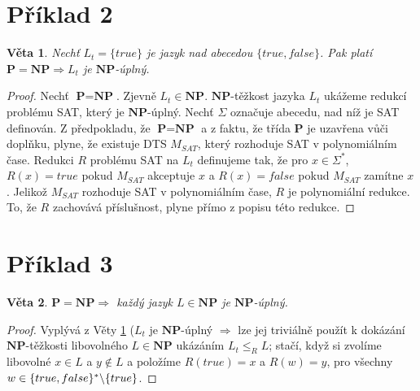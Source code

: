 \documentclass[10pt,a4paper]{article}
\newtheorem{theorem}{Věta}
\newcommand{\bs}{\char`\\} %
\begin{document}
\vspace{-1cm}
\section*{Příklad 2}

\begin{theorem}
\label{theorem:Ex2}
	Nechť $L_{t} = \{true\}$ je jazyk nad abecedou $\{true, false\}$. Pak platí $\textbf{P} = \textbf{NP} \Rightarrow L_{t}$ je $\textbf{NP}$-úplný.
\end{theorem}

\begin{proof}
	Nechť $\textbf{P} = \textbf{NP}$. Zjevně $L_{t} \in \textbf{NP}$. $\textbf{NP}$-těžkost jazyka $L_{t}$ ukážeme redukcí problému SAT, který je $\textbf{NP}$-úplný. Nechť $\Sigma$ označuje abecedu, nad níž je SAT definován. Z předpokladu, že $\textbf{P} = \textbf{NP}$ a z faktu, že třída \textbf{P} je uzavřena vůči doplňku, plyne, že existuje DTS $M_{SAT}$, který rozhoduje SAT v polynomiálním čase. Redukci $R$ problému SAT na $L_{t}$ definujeme tak, že pro $x \in \Sigma^{*}$, $R(x) = true$ pokud $M_{SAT}$ akceptuje $x$ a $R(x) = false$ pokud $M_{SAT}$ zamítne $x$. Jelikož $M_{SAT}$ rozhoduje SAT v polynomiálním čase, $R$ je polynomiální redukce. To, že $R$ zachovává příslušnost, plyne přímo z popisu této redukce.
\end{proof}

\section*{Příklad 3}

\begin{theorem}
\label{theorem:Ex3}
	$\textbf{P} = \textbf{NP} \Rightarrow$ každý jazyk $L \in \textbf{NP}$ je $\textbf{NP}$-úplný.
\end{theorem}

\begin{proof}
	Vyplývá z Věty \ref{theorem:Ex2} ($L_{t}$ je $\textbf{NP}$-úplný $\Rightarrow$ lze jej triviálně použít k dokázání $\textbf{NP}$-těžkosti libovolného $L \in \textbf{NP}$ ukázáním $L_{t} \leq_{R} L$; stačí, když si zvolíme libovolné $x \in L$ a $y \notin L$ a položíme $R(true) = x$ a $R(w) = y$, pro všechny $w \in \{true, false\}^{*}\bs\{true\}$.
\end{proof}
\end{document}
